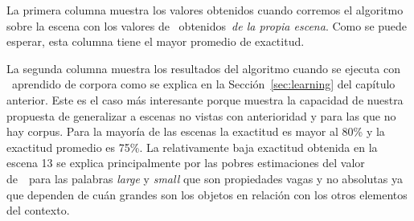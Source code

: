 La primera columna muestra los valores obtenidos cuando corremos el algoritmo sobre la escena
con los valores de \puse\ obtenidos~\emph{de la propia escena}. Como se puede esperar,
esta columna tiene el mayor promedio de exactitud.

La segunda columna muestra los resultados del algoritmo cuando se ejecuta con \puse\ aprendido de
corpora como se explica en la Secci\'on~\ref{sec:learning} del cap\'itulo anterior. Este es el caso m\'as interesante porque muestra la capacidad de nuestra propuesta de generalizar a escenas no vistas con anterioridad y para las que no hay corpus. Para la mayor\'{i}a de las escenas la exactitud
es mayor al 80\% y la exactitud promedio es 75\%. La relativamente baja exactitud
obtenida en la escena 13 se explica principalmente por las pobres estimaciones del valor de~\puse\ para las palabras \emph{large} y \emph{small} que son propiedades vagas y no absolutas ya que dependen de cu\'an grandes son los objetos en relaci\'on con los otros elementos del contexto.  

